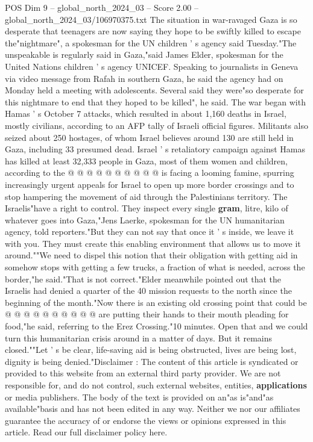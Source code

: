 \begin{textsample}{POS Dim 9 – global\_north\_2024\_03 – Score 2.00 – global\_north\_2024\_03/106970375.txt}  \label{ex:f9_pos_200}
The situation in war-ravaged Gaza is so desperate that teenagers are now saying they hope to be swiftly killed to escape the"nightmare", a spokesman for the UN children ' s agency said Tuesday."The unspeakable is regularly said in Gaza,"said James Elder, spokesman for the United Nations children ' s agency UNICEF.
Speaking to journalists in Geneva via video message from Rafah in southern Gaza, he said the agency had on Monday held a meeting with adolescents.
Several said they were"so desperate for this nightmare to end that they hoped to be killed", he said.
The war began with Hamas ' s October 7 attacks, which resulted in about 1,160 deaths in Israel, mostly civilians, according to an AFP tally of Israeli official figures.
Militants also seized about 250 hostages, of whom Israel believes around 130 are still held in Gaza, including 33 presumed dead.
Israel ' s retaliatory campaign against Hamas has killed at least 32,333 people in Gaza, most of them women and children, according to the @ @ @ @ @ @ @ @ @ @ is facing a looming famine, spurring increasingly urgent appeals for Israel to open up more border crossings and to stop hampering the movement of aid through the Palestinians territory.
The Israelis"have a right to control.
They inspect every single \textbf{gram}, litre, kilo of whatever goes into Gaza,"Jens Laerke, spokesman for the UN humanitarian agency, told reporters."But they can not say that once it ' s inside, we leave it with you.
They must create this enabling environment that allows us to move it around.""We need to dispel this notion that their obligation with getting aid in somehow stops with getting a few trucks, a fraction of what is needed, across the border,"he said."That is not correct."Elder meanwhile pointed out that the Israelis had denied a quarter of the 40 mission requests to the north since the beginning of the month."Now there is an existing old crossing point that could be @ @ @ @ @ @ @ @ @ @ are putting their hands to their mouth pleading for food,"he said, referring to the Erez Crossing."10 minutes.
Open that and we could turn this humanitarian crisis around in a matter of days.
But it remains closed.""Let ' s be clear, life-saving aid is being obstructed, lives are being lost, dignity is being denied."Disclaimer : The content of this article is syndicated or provided to this website from an external third party provider.
We are not responsible for, and do not control, such external websites, entities, \textbf{applications} or media publishers.
The body of the text is provided on an"as is"and"as available"basis and has not been edited in any way.
Neither we nor our affiliates guarantee the accuracy of or endorse the views or opinions expressed in this article.
Read our full disclaimer policy here.

\end{textsample}

